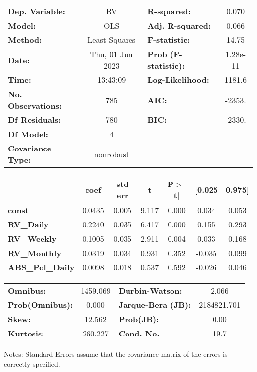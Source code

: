 \begin{center}
\begin{tabular}{lclc}
\toprule
\textbf{Dep. Variable:}    &        RV        & \textbf{  R-squared:         } &      0.070   \\
\textbf{Model:}            &       OLS        & \textbf{  Adj. R-squared:    } &      0.066   \\
\textbf{Method:}           &  Least Squares   & \textbf{  F-statistic:       } &      14.75   \\
\textbf{Date:}             & Thu, 01 Jun 2023 & \textbf{  Prob (F-statistic):} &   1.28e-11   \\
\textbf{Time:}             &     13:43:09     & \textbf{  Log-Likelihood:    } &     1181.6   \\
\textbf{No. Observations:} &         785      & \textbf{  AIC:               } &     -2353.   \\
\textbf{Df Residuals:}     &         780      & \textbf{  BIC:               } &     -2330.   \\
\textbf{Df Model:}         &           4      & \textbf{                     } &              \\
\textbf{Covariance Type:}  &    nonrobust     & \textbf{                     } &              \\
\bottomrule
\end{tabular}
\begin{tabular}{lcccccc}
                         & \textbf{coef} & \textbf{std err} & \textbf{t} & \textbf{P$> |$t$|$} & \textbf{[0.025} & \textbf{0.975]}  \\
\midrule
\textbf{const}           &       0.0435  &        0.005     &     9.117  &         0.000        &        0.034    &        0.053     \\
\textbf{RV\_Daily}       &       0.2240  &        0.035     &     6.417  &         0.000        &        0.155    &        0.293     \\
\textbf{RV\_Weekly}      &       0.1005  &        0.035     &     2.911  &         0.004        &        0.033    &        0.168     \\
\textbf{RV\_Monthly}     &       0.0319  &        0.034     &     0.931  &         0.352        &       -0.035    &        0.099     \\
\textbf{ABS\_Pol\_Daily} &       0.0098  &        0.018     &     0.537  &         0.592        &       -0.026    &        0.046     \\
\bottomrule
\end{tabular}
\begin{tabular}{lclc}
\textbf{Omnibus:}       & 1459.069 & \textbf{  Durbin-Watson:     } &      2.066   \\
\textbf{Prob(Omnibus):} &   0.000  & \textbf{  Jarque-Bera (JB):  } & 2184821.701  \\
\textbf{Skew:}          &  12.562  & \textbf{  Prob(JB):          } &       0.00   \\
\textbf{Kurtosis:}      & 260.227  & \textbf{  Cond. No.          } &       19.7   \\
\bottomrule
\end{tabular}
\end{center}

Notes: \newline
 [1] Standard Errors assume that the covariance matrix of the errors is correctly specified.